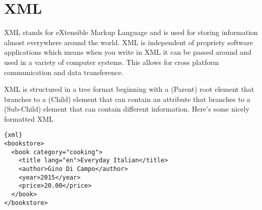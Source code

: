 
\section{XML}
XML stands for eXtensible Markup Language and is used for storing information almost everywhere around the world. XML is independent of propriety software applications which means when you write in XML it can be passed around and used in a variety of computer systems. This allows for cross platform communication and data transference.\newline

XML is structured in a tree format beginning with a (Parent) root element that branches to a (Child) element that can contain an attribute that branches to a (Sub-Child) element that can contain different information.\newline 
Here's some nicely formatted XML

\begin{verbatim}{xml}
<bookstore>
  <book category="cooking">
    <title lang="en">Everyday Italian</title>
    <author>Gino Di Campo</author>
    <year>2015</year>
    <price>20.00</price>
  </book>
</bookstore>
\end{verbatim}

